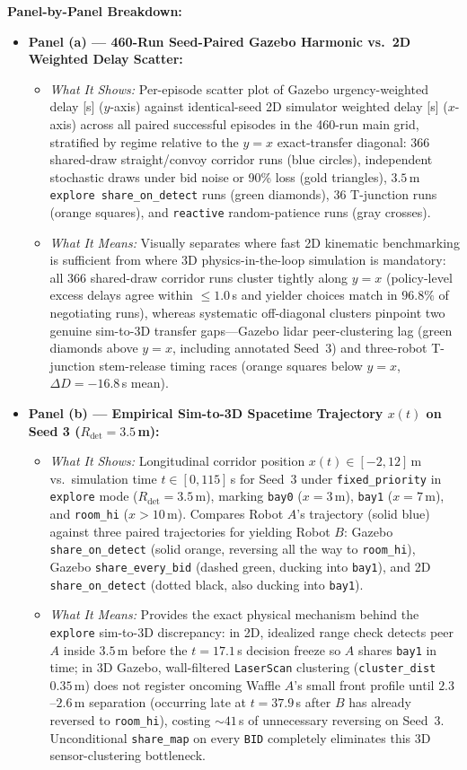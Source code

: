 \documentclass[10pt,a4paper]{article}
\begin{document}
\textbf{Panel-by-Panel Breakdown:}
\begin{itemize}
  \item \textbf{Panel (a) --- 460-Run Seed-Paired Gazebo Harmonic vs.\ 2D Weighted Delay Scatter:}
  \begin{itemize}
    \item \emph{What It Shows:} Per-episode scatter plot of Gazebo urgency-weighted delay [s] ($y$-axis) against identical-seed 2D simulator weighted delay [s] ($x$-axis) across all paired successful episodes in the 460-run main grid, stratified by regime relative to the $y=x$ exact-transfer diagonal: 366 shared-draw straight/convoy corridor runs (blue circles), independent stochastic draws under bid noise or 90\% loss (gold triangles), $3.5$\,m \texttt{explore share\_on\_detect} runs (green diamonds), 36 T-junction runs (orange squares), and \texttt{reactive} random-patience runs (gray crosses).
    \item \emph{What It Means:} Visually separates where fast 2D kinematic benchmarking is sufficient from where 3D physics-in-the-loop simulation is mandatory: all 366 shared-draw corridor runs cluster tightly along $y=x$ (policy-level excess delays agree within $\le 1.0$\,s and yielder choices match in $96.8\%$ of negotiating runs), whereas systematic off-diagonal clusters pinpoint two genuine sim-to-3D transfer gaps---Gazebo lidar peer-clustering lag (green diamonds above $y=x$, including annotated Seed~3) and three-robot T-junction stem-release timing races (orange squares below $y=x$, $\Delta D=-16.8$\,s mean).
  \end{itemize}
  \item \textbf{Panel (b) --- Empirical Sim-to-3D Spacetime Trajectory $x(t)$ on Seed 3 ($R_{\mathrm{det}}=3.5$\,m):}
  \begin{itemize}
    \item \emph{What It Shows:} Longitudinal corridor position $x(t)\in[-2,12]$\,m vs.\ simulation time $t\in[0,115]$\,s for Seed~3 under \texttt{fixed\_priority} in \texttt{explore} mode ($R_{\mathrm{det}}=3.5$\,m), marking \texttt{bay0} ($x=3$\,m), \texttt{bay1} ($x=7$\,m), and \texttt{room\_hi} ($x>10$\,m). Compares Robot $A$'s trajectory (solid blue) against three paired trajectories for yielding Robot $B$: Gazebo \texttt{share\_on\_detect} (solid orange, reversing all the way to \texttt{room\_hi}), Gazebo \texttt{share\_every\_bid} (dashed green, ducking into \texttt{bay1}), and 2D \texttt{share\_on\_detect} (dotted black, also ducking into \texttt{bay1}).
    \item \emph{What It Means:} Provides the exact physical mechanism behind the \texttt{explore} sim-to-3D discrepancy: in 2D, idealized range check detects peer $A$ inside $3.5$\,m before the $t=17.1$\,s decision freeze so $A$ shares \texttt{bay1} in time; in 3D Gazebo, wall-filtered \texttt{LaserScan} clustering (\texttt{cluster\_dist} $0.35$\,m) does not register oncoming Waffle $A$'s small front profile until $2.3$--$2.6$\,m separation (occurring late at $t=37.9$\,s after $B$ has already reversed to \texttt{room\_hi}), costing $\sim 41$\,s of unnecessary reversing on Seed~3. Unconditional \texttt{share\_map} on every \texttt{BID} completely eliminates this 3D sensor-clustering bottleneck.

\end{itemize}
\end{itemize}
\end{document}
